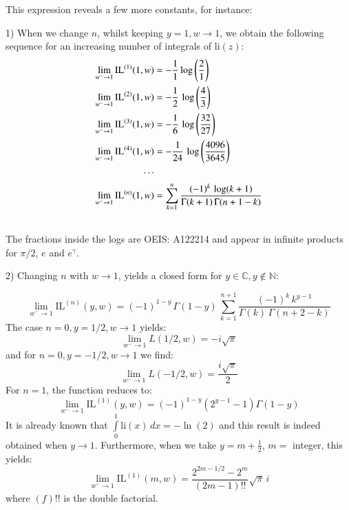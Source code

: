 \documentclass[a4paper,11pt,twoside]{amsart}
\newcommand\IL{\mathrm{IL}}
\newcommand\li{\mathrm{li}}
\begin{document}
This expression reveals a few more constants, for instance:

1) When we change $n$, whilst keeping $y=1, w \rightarrow 1$, we obtain the following sequence for an increasing number of integrals of $\li(z)$:
\begin{align}
\lim_{w^{-} \to 1} \IL^{(1)}(1,w) &= -\frac{1}{1}\log\left(\frac{2}{1}\right) \notag\\
\lim_{w^{-} \to 1} \IL^{(2)}(1,w) &= -\frac{1}{2}\,\log\left(\frac{4}{3}\right) \notag\\
\lim_{w^{-} \to 1} \IL^{(3)}(1,w) &= -\frac{1}{6}\,\log\left(\frac{32}{27}\right) \notag\\
\lim_{w^{-} \to 1} \IL^{(4)}(1,w) &= -\frac{1}{24}\,\log\left(\frac{4096}{3645}\right) \notag\\
\cdots \notag\\ 
\lim_{w^{-} \to 1} \IL^{(n)}(1,w) &= \sum_{k=1}^n \frac{(-1)^k\,\log(k+1)}{\Gamma(k+1)\,\Gamma(n+1-k)} \\ 
\notag
\end{align} 
The fractions inside the logs are OEIS: A122214 \cite{oeis2} and appear in infinite products for $\pi/2$, $e$ and $e^\gamma$.

2) Changing $n$ with $w \rightarrow 1$, yields a closed form for $y \in \mathbb{C}, y \notin \mathbb{N}$:

\begin{equation}\label{rootscomp5}
\lim_{w^{-} \to 1} \IL^{(n)}(y,w) = (-1)^{1-y}\,\Gamma(1-y)\,\sum_{k=1}^{n+1} \frac{(-1)^k\,k^{y-1}}{\Gamma(k)\,\Gamma(n+2-k)} 
\end{equation}
The case $n=0, y=1/2, w \rightarrow 1$ yields:
\begin{equation}\label{rootscomp6}
\lim_{w^{-} \to 1} L(1/2,w) = -i\sqrt{\pi}
\end{equation}
and for $n=0, y=-1/2, w \rightarrow 1$ we find:
\begin{equation}\label{rootscomp7}
\lim_{w^{-} \to 1} L(-1/2,w) = \frac{i\sqrt{\pi}}{2}
\end{equation}
For $n=1$, the function reduces to:
\begin{equation}\label{rootscomp8}
 \lim_{w^{-} \to 1} \IL^{(1)}(y,w) = (-1)^{1-y} \left(2^{y-1}-1\right)\Gamma(1-y)
 \end{equation} 
It is already known that $\int\limits_{0}^{1} \li(x)\, dx = -\ln(2)$ and this result is indeed obtained when $y \rightarrow 1$. Furthermore, when we take $y = m+\frac12$, $m = $ integer, this yields: 
\begin{equation}\label{rootscomp9}
\lim_{w^{-} \to 1} \IL^{(1)}(m,w) = \frac{2^{2m-1/2} - 2^m}{(2m - 1)!!} \sqrt{\pi}\, i 
\end{equation}
where $(f)!!$ is the double factorial.
\end{document}
